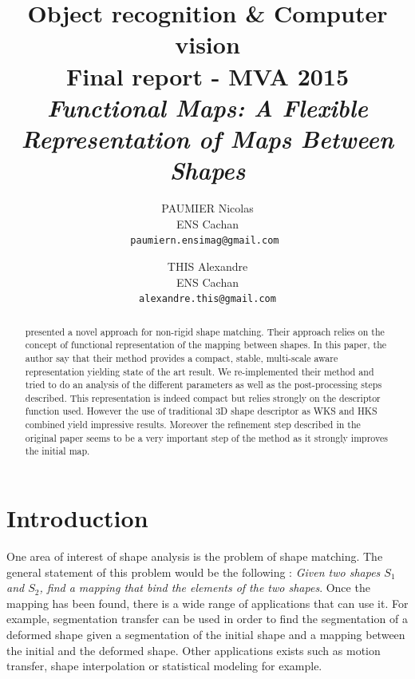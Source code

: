 \documentclass[10pt,twocolumn,letterpaper]{article}
\begin{document}
\title{Object recognition \& Computer vision \\ Final report - MVA 2015 \\ \textit{Functional Maps: A Flexible Representation of Maps Between Shapes}}

\author{PAUMIER Nicolas\\
ENS Cachan\\
{\tt\small paumiern.ensimag@gmail.com }
\and
THIS Alexandre\\
ENS Cachan\\
{\tt\small alexandre.this@gmail.com}
}

\maketitle

\begin{abstract} %
\cite{ovs} presented a novel approach for non-rigid shape matching. Their approach relies on the concept of functional representation of the mapping between shapes. In this paper, the author say that their method provides a compact, stable, multi-scale aware representation yielding state of the art result. We re-implemented their method and tried to do an analysis of the different parameters as well as the post-processing steps described. This representation is indeed compact but relies strongly on the descriptor function used. However the use of traditional 3D shape descriptor as WKS and HKS combined yield impressive results. Moreover the refinement step described in the original paper seems to be a very important step of the method as it strongly improves the initial map.
\end{abstract}


\section{Introduction} %
One area of interest of shape analysis is the problem of shape matching. The general statement of this problem would be the following : \textit{Given two shapes $S_{1}$ and $S_{2}$, find a mapping that bind the elements of the two shapes}. Once the mapping has been found, there is a wide range of applications that can use it. For example, segmentation transfer can be used in order to find the segmentation of a deformed shape given a segmentation of the initial shape and a mapping between the initial and the deformed shape. Other applications exists such as motion transfer, shape interpolation or statistical modeling for example.
\end{document}

